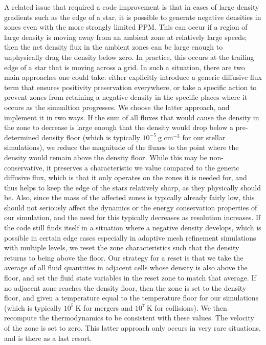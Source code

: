 \documentclass[12pt]{article}
\begin{document}
A related issue that required a code improvement is that in cases of
large density gradients such as the edge of a star, it is possible to
generate negative densities in zones even with the more strongly
limited PPM. This can occur if a region of large density is moving
away from an ambient zone at relatively large speeds; then the net
density flux in the ambient zones can be large enough to unphysically
drag the density below zero. In practice, this occurs at the
trailing edge of a star that is moving across a grid. In such a
situation, there are two main approaches one could take: either
explicitly introduce a generic diffusive flux term that ensures
positivity preservation everywhere, or take a specific action to
prevent zones from retaining a negative density in the specific places
where it occurs as the simualtion progresses. We choose the latter
approach, and implement it in two ways. If the sum of all fluxes that
would cause the density in the zone to decrease is large enough that the
density would drop below a pre-determined density floor (which is typically
$10^{-5}\ \text{g cm}^{-3}$ for our stellar simulations), we reduce
the magnitude of the fluxes to the point where the density would remain
above the density floor. While this may be non-conservative, it preserves a
characteristic we value compared to the generic diffusive flux, which is that
it only operates on the zones it is needed for, and thus helps to keep the
edge of the stars relatively sharp, as they physically should be. Also, since
the mass of the affected zones is typically already fairly low, this should not
seriously affect the dynamics or the energy conservation properties of our
simulation, and the need for this typically decreases as resolution increases.
If the code still finds itself in a situation where a negative density develops,
which is possible in certain edge cases especially in adaptive mesh refinement
simulations with multiple levels, we reset the zone characteristics such that
the density returns to being above the floor. Our strategy for a reset is
that we take the average of all fluid quantities in adjacent cells whose
density is also above the floor, and set the fluid state variables in the
reset zone to match that average. If no adjacent zone reaches the density
floor, then the zone is set to the density floor, and given a temperature
equal to the temperature floor for our simulations (which is typically 
$10^{5}\ \text{K}$ for mergers and $10^{7}\ \text{K}$ for collisions).
We then recompute the thermodynamics to be consistent with these values.
The velocity of the zone is set to zero. This latter approach only
occurs in very rare situations, and is there as a last resort.
\end{document}
